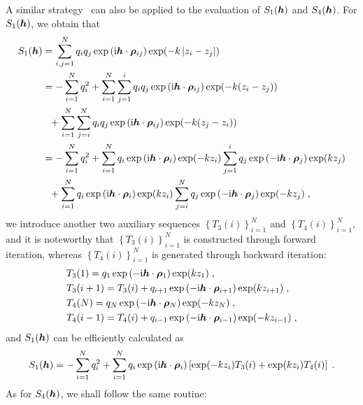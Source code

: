 A similar strategy~\cite{jiang2021approximating, gan2024fast} can also be applied to the evaluation of $S_1(\boldsymbol{h})$ and $S_4(\boldsymbol{h})$. For $S_1(\boldsymbol{h})$, we obtain that 
\begin{align*}
S_1(\boldsymbol{h})&=\sum_{i,j=1}^Nq_iq_j  \exp{(\mathrm{i} \boldsymbol{h} \cdot \boldsymbol{\rho}_{ij})}\exp(-k\left\lvert z_i-z_j\right\rvert)\\
&=-\sum_{i=1}^Nq_i^2+\sum_{i=1}^N \sum_{j=1}^iq_iq_j  \exp{(\mathrm{i} \boldsymbol{h} \cdot \boldsymbol{\rho}_{ij})}\exp(-k(z_i-z_j))\\
&~~+\sum_{i=1}^N \sum_{j=i}^Nq_iq_j  \exp{(\mathrm{i} \boldsymbol{h} \cdot \boldsymbol{\rho}_{ij})}\exp(-k(z_j-z_i))\\
&= -\sum_{i=1}^Nq_i^2+\sum_{i=1}^N q_i\exp{(\mathrm{i} \boldsymbol{h} \cdot \boldsymbol{\rho}_{i})}\exp(-kz_i)\sum_{j=1}^iq_j\exp{(-\mathrm{i} \boldsymbol{h} \cdot \boldsymbol{\rho}_{j})}\exp(kz_j)\\
&~~+\sum_{i=1}^N q_i\exp{(\mathrm{i} \boldsymbol{h} \cdot \boldsymbol{\rho}_{i})}\exp(kz_i)\sum_{j=i}^Nq_j\exp{(-\mathrm{i} \boldsymbol{h} \cdot \boldsymbol{\rho}_{j})}\exp(-kz_j)\;,
\end{align*}
 we introduce another two auxiliary sequences  $\left\{T_3(i)\right\}_{i=1}^N$ and $\left\{T_4(i)\right\}_{i=1}^N$, and it is noteworthy that $\left\{T_3(i)\right\}_{i=1}^N$ is  constructed through forward iteration, whereas  $\left\{T_4(i)\right\}_{i=1}^N$   is generated through backward iteration:
\begin{align*}
    &T_3(1)=q_1\exp{(-\mathrm{i} \boldsymbol{h} \cdot \boldsymbol{\rho}_{1})}\exp(kz_1)\;,\\
    &T_3(i+1)=T_3(i)+q_{i+1}\exp{(-\mathrm{i} \boldsymbol{h} \cdot \boldsymbol{\rho}_{i+1})}\exp(kz_{i+1})\;,\\
    &T_4(N)=q_N\exp{(-\mathrm{i} \boldsymbol{h} \cdot \boldsymbol{\rho}_{N})}\exp(-kz_N)\;,\\
    &T_4(i-1)=T_4(i)+q_{i-1}\exp{(-\mathrm{i} \boldsymbol{h} \cdot \boldsymbol{\rho}_{i-1})}\exp(-kz_{i-1})\;,
\end{align*}
and
$S_1(\boldsymbol{h})$ can be efficiently calculated as
\[
S_1(\boldsymbol{h})= -\sum_{i=1}^Nq_i^2+ \sum_{i=1}^N q_i\exp{(\mathrm{i} \boldsymbol{h} \cdot \boldsymbol{\rho}_{i})}\left[\exp(-kz_i)T_3(i)+\exp(kz_i)T_4(i)\right]\;.
\]
As for $S_4(\boldsymbol{h})$, we shall follow the same routine:
